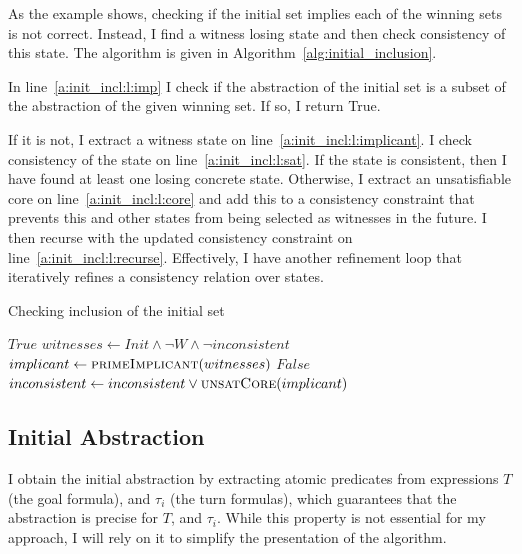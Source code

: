 As the example shows, checking if the initial set implies each of the winning sets is not correct. Instead, I find a witness losing state and then check consistency of this state. The algorithm is given in Algorithm~\ref{alg:initial_inclusion}. 

In line~\ref{a:init_incl:l:imp} I check if the abstraction of the initial set is a subset of the abstraction of the given winning set. If so, I return True.

If it is not, I extract a witness state on line~\ref{a:init_incl:l:implicant}. I check consistency of the state on line~\ref{a:init_incl:l:sat}. If the state is consistent, then I have found at least one losing concrete state. Otherwise, I extract an unsatisfiable core on line~\ref{a:init_incl:l:core} and add this to a consistency constraint that prevents this and other states from being selected as witnesses in the future. I then recurse with the updated consistency constraint on line~\ref{a:init_incl:l:recurse}. Effectively, I have another refinement loop that iteratively refines a consistency relation over states. 

\begin{algorithm}
\caption{Checking inclusion of the initial set}
\label{alg:initial_inclusion}

\begin{algorithmic}[1]

 \label{a:init_incl:l:imp}
        \State\Return $True$
    \Else
        \State $witnesses \gets Init \land \neg W \land \neg inconsistent$ \label{a:init_incl:l:witness}
        \State $implicant \gets \Call{primeImplicant}{witnesses}$ \label{a:init_incl:l:implicant}
         \label{a:init_incl:l:sat}
            \State\Return $False$
        \Else
            \State $inconsistent \gets inconsistent \lor \Call{unsatCore}{implicant}$ \label{a:init_incl:l:core}
            \State{} \label{a:init_incl:l:recurse}
        \EndIf
    \EndIf
\EndFunction

\end{algorithmic}
\end{algorithm}

\subsection{Initial Abstraction}

I obtain the initial abstraction by extracting atomic predicates from expressions $T$ (the goal formula), and $\tau_i$ (the turn formulas), which guarantees that the abstraction is precise for $T$, and $\tau_i$. While this property is not essential for my approach, I will rely on it to simplify the presentation of the algorithm.

